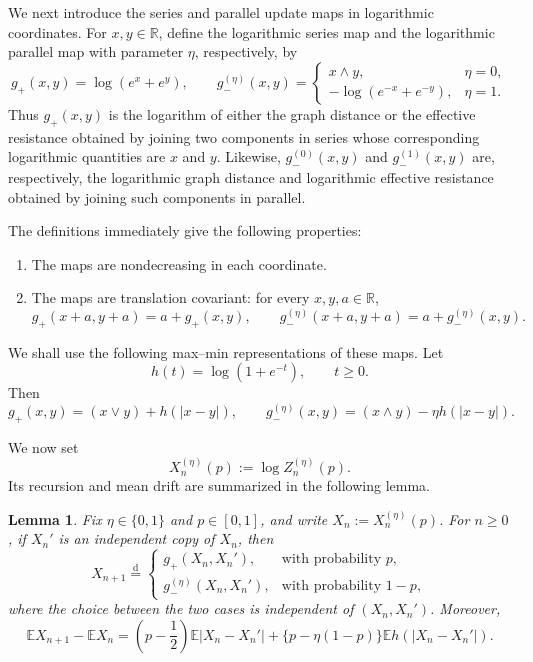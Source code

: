 \documentclass[12pt,preprint]{amsart}
\numberwithin{equation}{section}
\theoremstyle{plain}
\newtheorem{lemma}[theorem]{Lemma}
\theoremstyle{definition}
\newcommand{\E}{\mathbb E}
\newcommand{\R}{\mathbb R}
\begin{document}
We next introduce the series and parallel update maps in logarithmic coordinates.
For $x,y\in\R$, define the
logarithmic series map and the logarithmic parallel map with parameter
$\eta$, respectively, by
\[
 g_+(x,y)=\log(e^x+e^y),
 \qquad
 g_-^{(\eta)}(x,y)=
 \begin{cases}
  x\wedge y,&\eta=0,\\
 -\log(e^{-x}+e^{-y}),&\eta=1.
 \end{cases}
\]
Thus $g_+(x,y)$ is the logarithm of either the graph distance or the effective
resistance obtained by joining two components in series whose corresponding
logarithmic quantities are $x$ and $y$.  Likewise, $g_-^{(0)}(x,y)$ and
$g_-^{(1)}(x,y)$ are, respectively, the logarithmic graph distance and
logarithmic effective resistance obtained by joining such components in
parallel.

The definitions immediately give the following properties:
\begin{enumerate}
\item The maps are nondecreasing in each coordinate.
\item The maps are translation covariant: for every $x,y,a\in\R$,
\begin{equation}
 g_+(x+a,y+a)=a+g_+(x,y),
 \qquad
 g_-^{(\eta)}(x+a,y+a)=a+g_-^{(\eta)}(x,y).
 \label{eq:gate-translation}
\end{equation}
\end{enumerate}

We shall use the following max--min representations of these maps.  Let
\[
 h(t)=\log(1+e^{-t}),\qquad t\ge0.
\]
Then
\begin{equation}
 g_+(x,y)=(x\vee y)+h(|x-y|),
 \qquad
 g_-^{(\eta)}(x,y)=(x\wedge y)-\eta h(|x-y|).
 \label{eq:log-series-gate}
\end{equation}

We now set
\[
 X_n^{(\eta)}(p):=\log Z_n^{(\eta)}(p).
\]
Its recursion and mean drift are summarized in the following lemma.

\begin{lemma}
\label{lem:logarithmic-drift}
Fix $\eta\in\{0,1\}$ and $p\in[0,1]$, and write
$X_n:=X_n^{(\eta)}(p)$.  For $n\ge0$, if $X_n'$ is an independent copy of
$X_n$, then
\begin{equation}
 X_{n+1}\overset{\mathrm d}{=}
 \begin{cases}
  g_+(X_n,X_n'),&\text{with probability }p,\\
  g_-^{(\eta)}(X_n,X_n'),&\text{with probability }1-p,
 \end{cases}
 \label{eq:log-rde}
\end{equation}
where the choice between the two cases is independent of $(X_n,X_n')$.
Moreover,
\begin{equation}
 \E X_{n+1}-\E X_n
 =\left(p-\frac12\right)\E|X_n-X_n'|
 +\{p-\eta(1-p)\}\E h(|X_n-X_n'|).
 \label{eq:drift-identity}
\end{equation}
\end{lemma}
\end{document}
